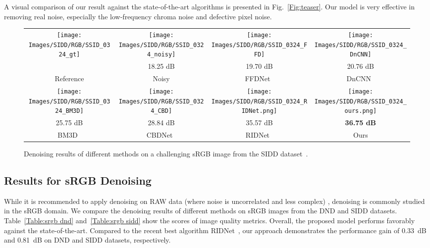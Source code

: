 \documentclass[10pt,twocolumn,letterpaper]{article}
\begin{document}
A visual comparison of our result against the state-of-the-art algorithms is presented in Fig.~\ref{Fig:teaser}. 
Our model is very effective in removing real noise, especially the low-frequency chroma noise and defective pixel noise.  



\begin{figure}[t]
\begin{center}
\begin{tabular}[t]{c@{ }c@{ }c@{ }c} \hspace{-2mm}
\texttt{[image: Images/SIDD/RGB/SSID\_0324\_gt]}&    \hspace{-1.2mm}
\texttt{[image: Images/SIDD/RGB/SSID\_0324\_noisy]}& \hspace{-1.2mm}
\texttt{[image: Images/SIDD/RGB/SSID\_0324\_FFD]}&   \hspace{-1.2mm}
\texttt{[image: Images/SIDD/RGB/SSID\_0324\_DnCNN]}\\
 & 18.25 dB & 19.70 dB& 20.76 dB \\
Reference & Noisy & FFDNet~\cite{FFDNetPlus}& DnCNN~\cite{DnCNN} \\ \hspace{-2mm}
\texttt{[image: Images/SIDD/RGB/SSID\_0324\_BM3D]}&  \hspace{-1.2mm}
\texttt{[image: Images/SIDD/RGB/SSID\_0324\_CBD]}&  \hspace{-1.2mm}
\texttt{[image: Images/SIDD/RGB/SSID\_0324\_RIDNet.png]}&  \hspace{-1.2mm}
\texttt{[image: Images/SIDD/RGB/SSID\_0324\_ours.png]}\\
25.75 dB& 28.84 dB & 35.57 dB& \textbf{36.75 dB}\\
BM3D~\cite{BM3D}  & CBDNet~\cite{CBDNet}  & RIDNet~\cite{RIDNet}& Ours \\
\end{tabular}
\end{center}
\vspace*{-6mm}
\caption{Denoising results of different methods on a challenging sRGB image from the SIDD dataset~\cite{sidd}.}
\label{Fig:srgb sidd}
\vspace*{-2mm}
\end{figure}

\subsection{Results for sRGB Denoising}
While it is recommended to apply denoising on RAW data (where noise is uncorrelated and less complex) \cite{ghimpecteanu2016local}, denoising is commonly studied in the sRGB domain. 
We compare the denoising results of different methods on sRGB images from the DND and SIDD datasets. 
Table~\ref{Table:srgb dnd} and~\ref{Table:srgb sidd}
show the scores of image quality metrics. 
Overall, the proposed model performs favorably against 
the state-of-the-art. Compared to the recent best algorithm RIDNet~\cite{RIDNet}, our approach demonstrates the performance gain of 0.33~dB and 0.81~dB on DND and SIDD datasets, respectively.
\end{document}

